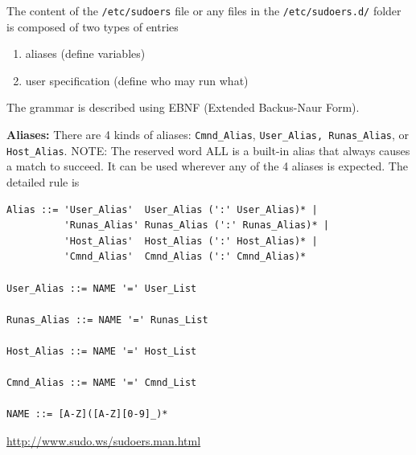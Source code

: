The content of the \verb!/etc/sudoers! file or
any files in the \verb!/etc/sudoers.d/! folder is composed of two types of
entries
\begin{enumerate}
  \item aliases (define variables)
  \item user specification (define who may run what)
\end{enumerate}
The grammar is described using EBNF (Extended Backus-Naur Form).

{\bf Aliases:} There are 4 kinds of aliases:
 \verb!Cmnd_Alias!, \verb!User_Alias, Runas_Alias!, or \verb!Host_Alias!. 
NOTE: The reserved word ALL is a built-in alias that always causes a match to
succeed. It can be used wherever any of the 4 aliases is expected.
The detailed rule is 
\begin{verbatim}
Alias ::= 'User_Alias'  User_Alias (':' User_Alias)* |
          'Runas_Alias' Runas_Alias (':' Runas_Alias)* |
          'Host_Alias'  Host_Alias (':' Host_Alias)* |
          'Cmnd_Alias'  Cmnd_Alias (':' Cmnd_Alias)*
 
User_Alias ::= NAME '=' User_List
 
Runas_Alias ::= NAME '=' Runas_List
 
Host_Alias ::= NAME '=' Host_List
 
Cmnd_Alias ::= NAME '=' Cmnd_List
 
NAME ::= [A-Z]([A-Z][0-9]_)*
\end{verbatim}
\url{http://www.sudo.ws/sudoers.man.html}

